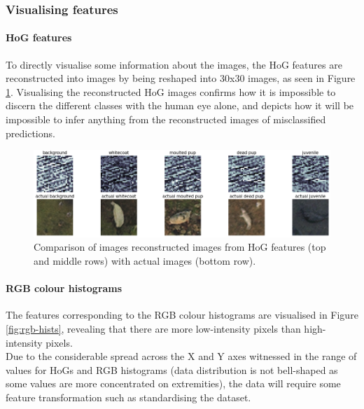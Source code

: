 \documentclass[letterpaper,12pt]{article}
\begin{document}
\subsubsection{Visualising features}

\paragraph{HoG features}

To directly visualise some information about the images, the HoG features are reconstructed into images by being reshaped into 30x30 images, as seen in Figure \ref{fig:hog_multi}. Visualising the reconstructed HoG images confirms how it is impossible to discern the different classes with the human eye alone, and depicts how it will be impossible to infer anything from the reconstructed images of misclassified predictions.

\begin{figure}[h]
\centerline{\includegraphics[width=\textwidth]{report/figures/hog_multi.png}}
\caption{\label{fig:hog_multi}Comparison of images reconstructed images from HoG features (top and middle rows) with actual images (bottom row).}
\end{figure}

\paragraph{RGB colour histograms}

The features corresponding to the RGB colour histograms are visualised in Figure \ref{fig:rgb-hists}, revealing that there are more low-intensity pixels than high-intensity pixels.\\

Due to the considerable spread across the X and Y axes witnessed in the range of values for HoGs and RGB histograms (data distribution is not bell-shaped  as some values are more concentrated on extremities), the data will require some feature transformation such as standardising the dataset.
\end{document}
